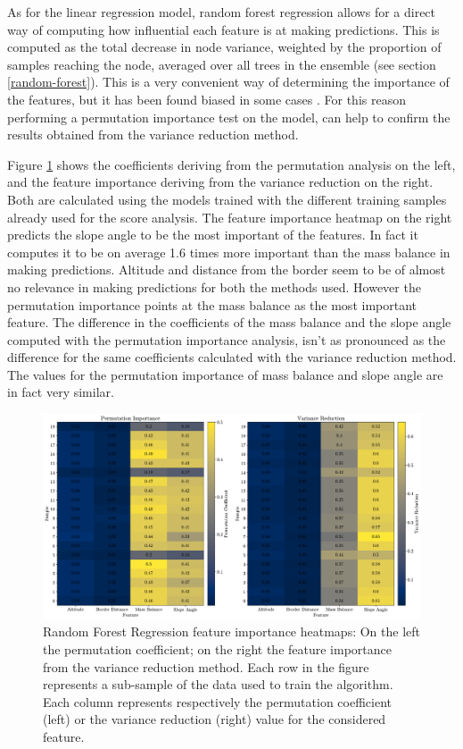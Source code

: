 As for the linear regression model, random forest regression allows for a direct way of computing how influential each feature is at making predictions. This is computed as the total decrease in node variance, weighted by the proportion of samples reaching the node, averaged over all trees in the ensemble (see section \ref{random-forest}). This is a very convenient way of determining the importance of the features, but it has been found biased in some cases \citep{RandomFBias2007}. For this reason performing a permutation importance test on the model, can help to confirm the results obtained from the variance reduction method. 

Figure \ref{fig:rfr-heatmap} shows the coefficients deriving from the permutation analysis on the left, and the feature importance deriving from the variance reduction on the right. Both are calculated using the models trained with the different training samples already used for the score analysis. The feature importance heatmap on the right predicts the slope angle to be the most important of the features. In fact it computes it to be on average 1.6 times more important than the mass balance in making predictions. Altitude and distance from the border seem to be of almost no relevance in making predictions for both the methods used. However the permutation importance points at the mass balance as the most important feature. The difference in the coefficients of the mass balance and the slope angle computed with the permutation importance analysis, isn't as pronounced as the difference for the same coefficients calculated with the variance reduction method. The values for the permutation importance of mass balance and slope angle are in fact very similar.

\begin{figure}[!tp]
	\centering		  
	\includegraphics[width=1.\textwidth]{figures/RFR_heatmap.pdf}
	\caption{Random Forest Regression feature importance heatmaps: On the left the permutation coefficient; on the right the feature importance from the variance reduction method. Each row in the figure represents a sub-sample of the data used to train the algorithm. Each column represents respectively the permutation coefficient (left) or the variance reduction (right) value for the considered feature.}
	\label{fig:rfr-heatmap}
\end{figure}

